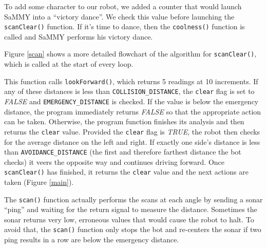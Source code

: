\documentclass[11pt]{article}
\begin{document}
To add some character to our robot, we added a counter that would launch SaMMY into a ``victory dance''.  We check this value before launching the \texttt{scanClear()} function.  If it's time to dance, then the \texttt{coolness()} function is called and SaMMY performs his victory dance.

Figure \ref{scan} shows a more detailed flowchart of the algorithm for \texttt{scanClear()}, which is called at the start of every loop.
  



This function calls \texttt{lookForward()}, which returns 5 readings at 10\degree \hspace{1pt} increments. If any of these distances is less than \texttt{COLLISION\_DISTANCE}, the \texttt{clear} flag is set to \emph{FALSE} and \texttt{EMERGENCY\_DISTANCE} is checked. If the value is below the emergency distance, the program immediately returns \emph{FALSE} so that the appropriate action can be taken. Otherwise, the program function finishes its analysis and then returns the \texttt{clear} value.
Provided the \texttt{clear} flag is \emph{TRUE}, the robot then checks for the average distance on the left and right. If exactly one side's distance is less than \texttt{AVOIDANCE\_DISTANCE} (the first and therefore farthest distance the bot checks) it veers the opposite way and continues driving forward. Once \texttt{scanClear()} has finished, it returns the \texttt{clear} value and the next actions are taken (Figure \ref{main}).

The \texttt{scan()} function actually performs the scans at each angle by sending a sonar ``ping'' and waiting for the return signal to measure the distance. Sometimes the sonar returns very low, erroneous values that would cause the robot to halt. To avoid that, the \texttt{scan()} function only stops the bot and re-centers the sonar if two ping results in a row are below the emergency distance. 

\end{document}

